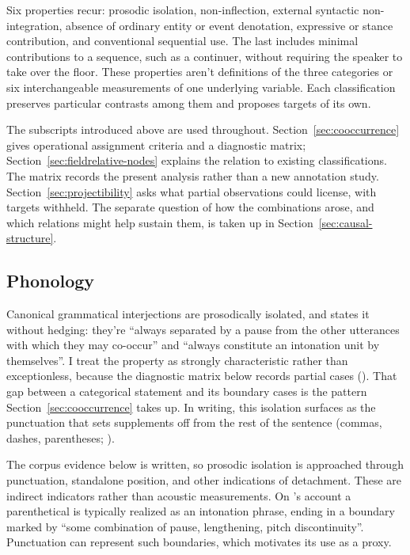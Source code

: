\documentclass[12pt]{article}
\begin{document}
Six properties recur: prosodic isolation, non-inflection, external syntactic non-integration, absence of ordinary entity or event denotation, expressive or stance contribution, and conventional sequential use. The last includes minimal contributions to a sequence, such as a continuer, without requiring the speaker to take over the floor. These properties aren't definitions of the three categories or six interchangeable measurements of one underlying variable. Each classification preserves particular contrasts among them and proposes targets of its own.

The subscripts introduced above are used throughout. Section~\ref{sec:cooccurrence} gives operational assignment criteria and a diagnostic matrix; Section~\ref{sec:fieldrelative-nodes} explains the relation to existing classifications. The matrix records the present analysis rather than a new annotation study. Section~\ref{sec:projectibility} asks what partial observations could license, with targets withheld. The separate question of how the combinations arose, and which relations might help sustain them, is taken up in Section~\ref{sec:causal-structure}.

\subsection{Phonology}\label{sec:phonology}

Canonical grammatical interjections are prosodically isolated, and \textcite[108]{ameka1992} states it without hedging: they're \enquote{always separated by a pause from the other utterances with which they may co-occur} and \enquote{always constitute an intonation unit by themselves}. I treat the property as strongly characteristic rather than exceptionless, because the diagnostic matrix below records partial cases (). That gap between a categorical statement and its boundary cases is the pattern Section~\ref{sec:cooccurrence} takes up. In writing, this isolation surfaces as the punctuation that sets supplements off from the rest of the sentence (commas, dashes, parentheses; \citealp[1350]{HuddlestonPullum2002}).

The corpus evidence below is written, so prosodic isolation is approached through punctuation, standalone position, and other indications of detachment. These are indirect indicators rather than acoustic measurements. On \textcite[41]{Jackendoff2025Parenthetical}'s account a parenthetical is typically realized as an intonation phrase, ending in a boundary marked by \enquote{some combination of pause, lengthening, pitch discontinuity}. Punctuation can represent such boundaries, which motivates its use as a proxy.
\end{document}
